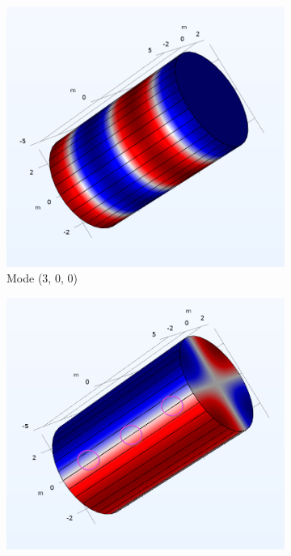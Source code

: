 {\begin{figure}[htbp]
    \centering   
    \begin{subfigure}{0.5\textwidth}
        \includegraphics[width=\textwidth]{Mode Profile 51_5 Hz.png}
            \caption{Mode (3, 0, 0)}
            \label{fig:sub1}
    \end{subfigure}    
    \vspace{0.25cm}
    \begin{subfigure}{0.5\textwidth}
        \includegraphics[width=\textwidth]{Mode Profile 55_8 Hz.png}

\end{subfigure}
\end{figure}}
